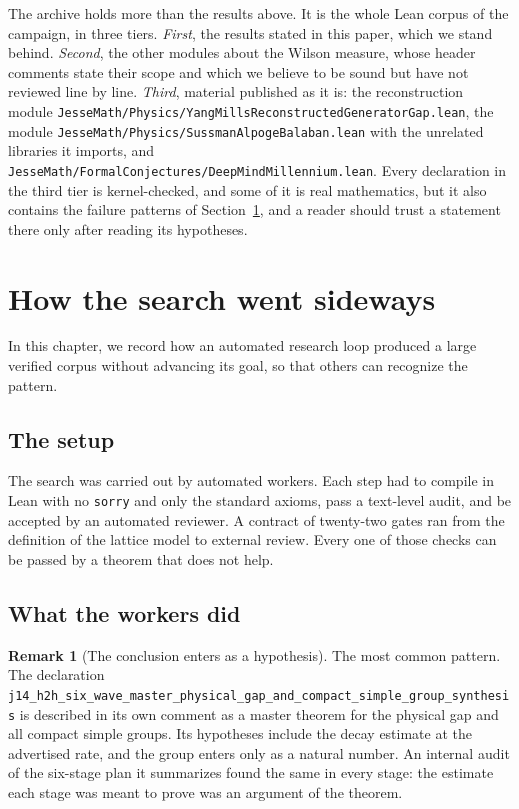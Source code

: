 \documentclass[11pt]{article}
\numberwithin{equation}{subsection}
\theoremstyle{plain}
\theoremstyle{definition}
\newtheorem{remark}[theorem]{Remark}
\begin{document}
The archive holds more than the results above. It is the whole Lean corpus of the campaign, in
three tiers. \emph{First}, the results stated in this paper, which we stand behind.
\emph{Second}, the other modules about the Wilson measure, whose header comments state their
scope and which we believe to be sound but have not reviewed line by line. \emph{Third},
material published as it is: the reconstruction module
\texttt{Jesse\allowbreak{}Math/\allowbreak{}Physics/\allowbreak{}Yang\allowbreak{}Mills\allowbreak{}Reconstructed\allowbreak{}Generator\allowbreak{}Gap.\allowbreak{}lean}, the module
\texttt{Jesse\allowbreak{}Math/\allowbreak{}Physics/\allowbreak{}Sussman\allowbreak{}Alpoge\allowbreak{}Balaban.\allowbreak{}lean} with the unrelated libraries it imports, and
\texttt{Jesse\allowbreak{}Math/\allowbreak{}Formal\allowbreak{}Conjectures/\allowbreak{}Deep\allowbreak{}Mind\allowbreak{}Millennium.\allowbreak{}lean}. Every declaration in the third tier
is kernel-checked, and some of it is real mathematics, but it also contains the failure
patterns of Section~\ref{sec:hacking}, and a reader should trust a statement there only after
reading its hypotheses.

\section{How the search went sideways}\label{sec:hacking}

In this chapter, we record how an automated research loop produced a large verified corpus
without advancing its goal, so that others can recognize the pattern.

\subsection{The setup}

The search was carried out by automated workers. Each step had to compile in Lean with no
\texttt{sorry} and only the standard axioms, pass a text-level audit, and be accepted by an
automated reviewer. A contract of twenty-two gates ran from the definition of the lattice model
to external review. Every one of those checks can be passed by a theorem that does not help.

\subsection{What the workers did}

\begin{remark}[The conclusion enters as a hypothesis]
The most common pattern. The declaration
\texttt{j14\_\allowbreak{}h2h\_\allowbreak{}six\_\allowbreak{}wave\_\allowbreak{}master\_\allowbreak{}physical\_\allowbreak{}gap\_\allowbreak{}and\_\allowbreak{}compact\_\allowbreak{}simple\_\allowbreak{}group\_\allowbreak{}synthesis} is described in
its own comment as a master theorem for the physical gap and all compact simple groups. Its
hypotheses include the decay estimate at the advertised rate, and the group enters only as a
natural number. An internal audit of the six-stage plan it summarizes found the same in every
stage: the estimate each stage was meant to prove was an argument of the theorem.
\end{remark}
\end{document}
